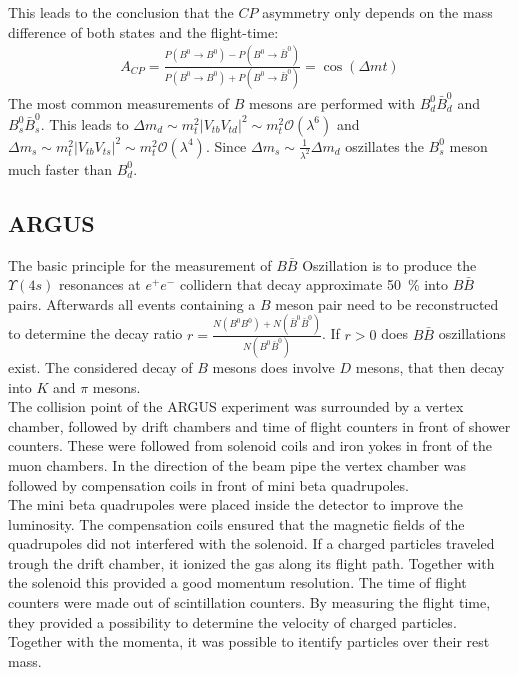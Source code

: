 This leads to the conclusion that the $CP$ asymmetry only depends on the mass difference of both states and the flight-time:
\begin{align*}
	A_{CP} = \frac{P(B^0\rightarrow B^0) - P(B^0\rightarrow \bar{B}^0)}{P(B^0\rightarrow B^0) + P(B^0\rightarrow \bar{B}^0)} = \cos(\Delta m t)
\end{align*}
The most common measurements of $B$ mesons are performed with $B_d^0\bar{B}_d^0$ and $B_s^0\bar{B}_s^0$. This leads to $\Delta m_d \sim m_t^2|V_{tb}V_{td}|^2 \sim m_t^2 \mathcal{O}(\lambda^6)$ and $\Delta m_s \sim m_t^2|V_{tb}V_{ts}|^2 \sim m_t^2 \mathcal{O}(\lambda^4)$.
Since $\Delta m_s \sim \frac{1}{\lambda^2} \Delta m_d$ oszillates the $B_s^0$ meson much faster than $B_d^0$.
\subsection{ARGUS}
The basic principle for the measurement of $B\bar{B}$ Oszillation is to produce the $\Upsilon(4s)$ resonances at $e^+e^-$ collidern that decay approximate \SI{50}{\percent} into $B\bar{B}$ pairs. Afterwards all events containing a $B$ meson pair need to be reconstructed to determine the decay ratio $r = \frac{N(B^0B^0)+ N(\bar{B}^0\bar{B}^0)}{N(B^0\bar{B}^0)}$. If $r>0$ does $B\bar{B}$ oszillations exist. The considered decay of $B$ mesons does involve $D$ mesons, that then decay into $K$ and $\pi$ mesons.\\
The collision point of the ARGUS experiment was surrounded by a vertex chamber, followed by drift chambers and  time of flight counters in front of shower counters. These were followed from solenoid coils and iron yokes in front of the muon chambers. In the direction of the beam pipe the vertex chamber was followed by compensation coils in front of mini beta quadrupoles. \\
The mini beta quadrupoles were placed inside the detector to improve the luminosity. The compensation coils ensured that the magnetic fields of the quadrupoles did not interfered with the solenoid. If a charged particles traveled trough the drift chamber, it ionized the gas along its flight path. Together with the solenoid this provided a good momentum resolution. The time of flight counters were made out of scintillation counters. By measuring the flight time, they provided a possibility to determine the velocity of charged particles. Together with the momenta, it was possible to itentify particles over their rest mass.
